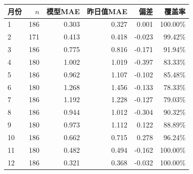 \begin{tabular}{lrrrrr}
\toprule
月份 & $n$ & 模型MAE & 昨日值MAE & 偏差 & 覆盖率 \\
\midrule
1 & 186 & 0.303 & 0.327 & 0.001 & 100.00\% \\
2 & 171 & 0.413 & 0.418 & -0.023 & 99.42\% \\
3 & 186 & 0.775 & 0.816 & -0.171 & 91.94\% \\
4 & 180 & 1.002 & 1.019 & -0.397 & 83.33\% \\
5 & 186 & 0.962 & 1.107 & -0.102 & 85.48\% \\
6 & 180 & 1.268 & 1.456 & -0.133 & 78.33\% \\
7 & 186 & 1.192 & 1.228 & -0.127 & 79.03\% \\
8 & 186 & 0.944 & 1.012 & -0.304 & 90.32\% \\
9 & 180 & 0.973 & 1.112 & 0.122 & 88.89\% \\
10 & 186 & 0.662 & 0.715 & 0.278 & 96.24\% \\
11 & 180 & 0.482 & 0.494 & -0.162 & 100.00\% \\
12 & 186 & 0.321 & 0.368 & -0.032 & 100.00\% \\
\bottomrule
\end{tabular}